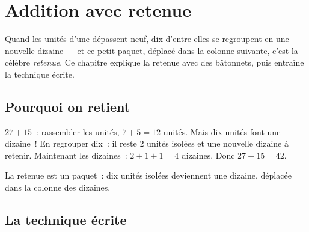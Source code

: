 \chapter{Addition avec retenue}\label{ch:g2:addition}

Quand les unités d'une  dépassent neuf, dix d'entre elles se
regroupent en une nouvelle dizaine --- et ce petit paquet, déplacé
dans la colonne suivante, c'est la célèbre \emph{retenue}. Ce
chapitre explique la retenue avec des bâtonnets, puis entraîne
la technique écrite.

\section{Pourquoi on retient}

\begin{example}\label{ex:g2:addition:bundle}
$27 + 15$~: rassembler les unités, $7 + 5 = 12$ unités. Mais
dix unités font une dizaine~! En regrouper dix~: il reste $2$
unités isolées et une nouvelle dizaine à retenir. Maintenant
les dizaines~: $2 + 1 + 1 = 4$ dizaines. Donc $27 + 15 = 42$.
\end{example}

\begin{omfigure}

{\small La retenue est un paquet~: dix unités isolées deviennent
une dizaine, déplacée dans la colonne des dizaines.}
\end{omfigure}

\section{La technique écrite}

